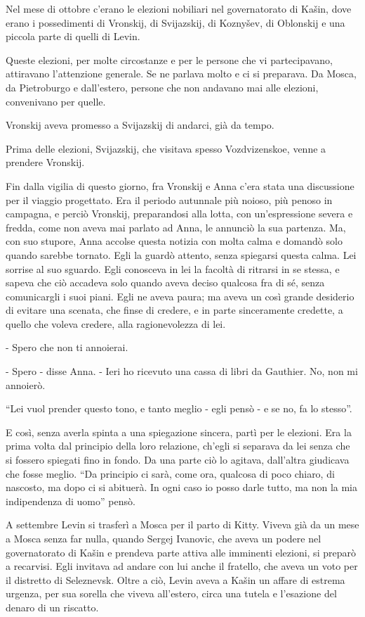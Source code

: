 Nel mese di ottobre c'erano le elezioni nobiliari nel governatorato di Kašin, dove erano i possedimenti di Vronskij, di Svijazskij, di Koznyšev, di Oblonskij e una piccola parte di quelli di Levin. 

Queste elezioni, per molte circostanze e per le persone che vi partecipavano, attiravano l'attenzione generale. Se ne parlava molto e ci si preparava. Da Mosca, da Pietroburgo e dall'estero, persone che non andavano mai alle elezioni, convenivano per quelle. 

Vronskij aveva promesso a Svijazskij di andarci, già da tempo. 

Prima delle elezioni, Svijazskij, che visitava spesso Vozdvizenskoe, venne a prendere Vronskij. 

Fin dalla vigilia di questo giorno, fra Vronskij e Anna c'era stata una discussione per il viaggio progettato. Era il periodo autunnale più noioso, più penoso in campagna, e perciò Vronskij, preparandosi alla lotta, con un'espressione severa e fredda, come non aveva mai parlato ad Anna, le annunciò la sua partenza. Ma, con suo stupore, Anna accolse questa notizia con molta calma e domandò solo quando sarebbe tornato. Egli la guardò attento, senza spiegarsi questa calma. Lei sorrise al suo sguardo. Egli conosceva in lei la facoltà di ritrarsi in se stessa, e sapeva che ciò accadeva solo quando aveva deciso qualcosa fra di sé, senza comunicargli i suoi piani. Egli ne aveva paura; ma aveva un così grande desiderio di evitare una scenata, che finse di credere, e in parte sinceramente credette, a quello che voleva credere, alla ragionevolezza di lei. 

- Spero che non ti annoierai. 

- Spero - disse Anna. - Ieri ho ricevuto una cassa di libri da Gauthier. No, non mi annoierò. 

``Lei vuol prender questo tono, e tanto meglio - egli pensò - e se no, fa lo stesso''. 

E così, senza averla spinta a una spiegazione sincera, partì per le elezioni. Era la prima volta dal principio della loro relazione, ch'egli si separava da lei senza che si fossero spiegati fino in fondo. Da una parte ciò lo agitava, dall'altra giudicava che fosse meglio. ``Da principio ci sarà, come ora, qualcosa di poco chiaro, di nascosto, ma dopo ci si abituerà. In ogni caso io posso darle tutto, ma non la mia indipendenza di uomo'' pensò. 

\label{xxvi-4} 

A settembre Levin si trasferì a Mosca per il parto di Kitty. Viveva già da un mese a Mosca senza far nulla, quando Sergej Ivanovic, che aveva un podere nel governatorato di Kašin e prendeva parte attiva alle imminenti elezioni, si preparò a recarvisi. Egli invitava ad andare con lui anche il fratello, che aveva un voto per il distretto di Seleznevsk. Oltre a ciò, Levin aveva a Kašin un affare di estrema urgenza, per sua sorella che viveva all'estero, circa una tutela e l'esazione del denaro di un riscatto. 

